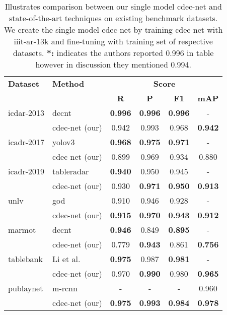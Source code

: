 \documentclass[a4paper,conference]{IEEEtran}
\begin{document}
\begin{table}[ht!]
\addtolength{\tabcolsep}{-2.0pt}
\begin{center}
\begin{tabular}{|l|l|c c c c|} \hline
\textbf{Dataset} &\textbf{Method} &\multicolumn{4}{|c|}{\textbf{Score}} \\ \cline{3-6}
 &  &\textbf{R} &\textbf{P} &\textbf{F1} &\textbf{mAP} \\ \hline 
{\sc icdar-2013} &{\sc d}e{\sc cnt}~\cite{siddiqui2018decnt} &\textbf{0.996} &\textbf{0.996} &\textbf{0.996} &- \\
 &{\sc cd}e{\sc c-n}et (our) &0.942 &0.993 &0.968 &\textbf{0.942} \\ \hline
{\sc icadr-2017} &{\sc yolo}v3~\cite{huang2019yolo} &\textbf{0.968} &\textbf{0.975} &\textbf{0.971} &- \\
&{\sc cd}e{\sc c-n}et (our) &0.899	&0.969 &0.934 &0.880 \\  \hline
{\sc icadr-2019} &{\sc t}able{\sc r}adar~\cite{gao2019icdar} &\textbf{0.940} &0.950 &0.945 &- \\
 &{\sc cd}e{\sc c-n}et (our) &0.930 &\textbf{0.971} &\textbf{0.950} &\textbf{0.913} \\ \hline 
 {\sc unlv} &{\sc god}~\cite{saha2019graphical} &0.910 &0.946 &0.928 &- \\ 
  &{\sc cd}e{\sc c-n}et (our) &\textbf{0.915} &\textbf{0.970} &\textbf{0.943} &\textbf{0.912} \\ \hline
{\sc m}armot &{\sc d}e{\sc cnt}~\cite{siddiqui2018decnt} &\textbf{0.946} &0.849 &\textbf{0.895} &- \\ 
&{\sc cd}e{\sc c-n}et (our) &0.779 &\textbf{0.943} &0.861 &\textbf{0.756} \\ \hline
{\sc t}able{\sc b}ank &Li et al.~\cite{li2019tablebank} &\textbf{0.975} &0.987 &\textbf{0.981} &- \\
 &{\sc cd}e{\sc c-n}et (our) &0.970 &\textbf{0.990} &0.980 &\textbf{0.965} \\ \hline
{\sc p}ub{\sc l}ay{\sc n}et &{\sc m-rcnn}~\cite{zhong2019publaynet} &- & -&- &0.960 \\ 
 &{\sc cd}e{\sc c-n}et (our) & \textbf{0.975} & \textbf{0.993} & \textbf{0.984} & \textbf{0.978}  \\ \hline
 \end{tabular}
\end{center}
\caption{Illustrates comparison between our single model {\sc cd}e{\sc c-n}et and state-of-the-art techniques on existing benchmark datasets. We create the single model {\sc cd}e{\sc c-n}et by training {\sc cd}e{\sc c-n}et with {\sc iiit-ar-13k} and fine-tuning with training set of respective datasets. \textbf{*:} indicates the authors reported 0.996 in table however in discussion they mentioned 0.994. \label{single_comparion_table}}
\end{table}
 
\end{document}
